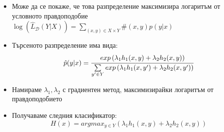 \documentclass[9pt]{beamer}
\newcommand{\B}[1]{\left(#1\right)}
\begin{document}
    \begin{frame}[t]
        \begin{itemize}
            \setlength\itemsep{\fill}
            \item Може да се покаже, че това разпределение максимизира логаритъм от условното правдоподобие
            \pause $\log\B{\widehat{L}_{\mathcal{D}}(Y|X)} = \sum\limits_{(x, y) \in X\times Y} \#(x, y) p(y|x)$
            \pause
            \item Търсеното разпределение има вида:
            \pause
            \[\hat{p}(y|x) = \cfrac{exp\B{\lambda_1 h_1(x, y) + \lambda_2 h_2(x, y)}}{\sum\limits_{y' \in Y} exp\B{\lambda_1 h_1(x, y') + \lambda_2 h_2(x, y')} }\]
            \pause
            \item Намираме $\lambda_1, \lambda_2$ с градиентен метод, максимизирайки логаритъм от правдоподобието
            \pause
            \item Получаваме следния класификатор:
            \pause \[H(x) = argmax_{y\in Y} \B{\lambda_1 h_1(x, y) + \lambda_2 h_2(x, y)}\]
        \end{itemize}
    \end{frame}
\end{document}
